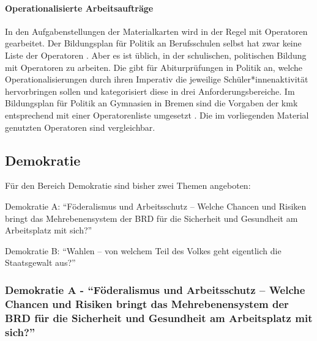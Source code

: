

\paragraph{Operationalisierte Arbeitsaufträge}
In den Aufgabenstellungen der Materialkarten wird in der Regel mit Operatoren gearbeitet. Der Bildungsplan für Politik an Berufsschulen selbst hat zwar keine Liste der Operatoren \autocite{bplan}. Aber es ist üblich, in der schulischen, politischen Bildung mit Operatoren zu arbeiten. Die \textcite[14-18]{KMK.2005} gibt für Abiturprüfungen in Politik an, welche Operationalisierungen durch ihren Imperativ die jeweilige Schüler*innenaktivität hervorbringen sollen und kategorisiert diese in drei Anforderungsbereiche. Im Bildungsplan für Politik an Gymnasien in Bremen sind die Vorgaben der \gls{kmk} entsprechend mit einer Operatorenliste umgesetzt \autocite[13-14]{lower2008}.
Die im vorliegenden Material genutzten Operatoren sind vergleichbar. 

\subsection{Demokratie \label{Denmokratie}}
Für den Bereich Demokratie sind bisher zwei Themen angeboten:
\begin{myenumerate}
    \item Demokratie A: \enquote{Föderalismus und Arbeitsschutz – Welche Chancen und Risiken bringt das Mehrebenensystem der BRD für die Sicherheit und Gesundheit am Arbeitsplatz mit sich?}
    \item Demokratie B: \enquote{Wahlen – von welchem Teil des Volkes geht eigentlich die Staatsgewalt aus?}
\end{myenumerate}



\subsubsection{Demokratie A - \enquote{Föderalismus und Arbeitsschutz – Welche Chancen und Risiken bringt das Mehrebenensystem der BRD für die Sicherheit und Gesundheit am Arbeitsplatz mit sich?} \label{DemokratieA}}

